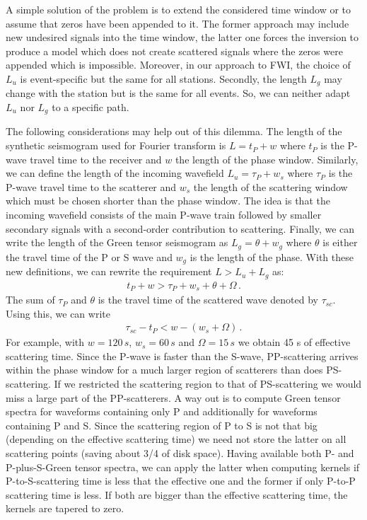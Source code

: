 A simple solution of the problem is to extend the considered time window or to assume that zeros have been appended to it. The former approach may include new undesired signals into the time window, the latter one forces the inversion to produce a model which does not create scattered signals where the zeros were appended which is impossible. Moreover, in our approach to FWI, the choice of $L_u$ is event-specific but the same for all stations. Secondly, the length $L_g$ may change with the station but is the same for all events. So, we can neither adapt $L_u$ nor $L_g$ to a specific path.

The following considerations may help out of this dilemma. The length of the synthetic seismogram used for Fourier transform is $L=t_P+w$ where $t_P$ is the P-wave travel time to the receiver and $w$ the length of the phase window. Similarly, we can define the length of the incoming wavefield $L_u = \tau_P+w_s$ where $\tau_P$ is the P-wave travel time to the scatterer and $w_s$ the length of the scattering window which must be chosen shorter than the phase window. The idea is that the incoming wavefield consists of the main P-wave train followed by smaller secondary signals with a second-order contribution to scattering. Finally, we can write the length of the Green tensor seismogram as $L_g = \theta+w_g$ where $\theta$ is either the travel time of the P or S wave and $w_g$ is the length of the phase. With these new definitions, we can rewrite the requirement $L > L_u+L_g$ as:
%
\begin{align}
	t_P+w > \tau_P + w_s+\theta+\Omega \,.
\end{align}
% 
The sum of $\tau_P$ and $\theta$ is the travel time of the scattered wave denoted by $\tau_{sc}$. Using this, we can write
%
\begin{align}
	\tau_{sc}-t_P < w-(w_s+\Omega) \,. 
\end{align}
% 
For example, with $w=120\,s$, $w_s = 60\,s$ and $\Omega = 15\,s$ we obtain 45 s of effective scattering time. Since the P-wave is faster than the S-wave, PP-scattering arrives within the phase window for a much larger region of scatterers than does PS-scattering. If we restricted the scattering region to that of PS-scattering we would miss a large part of the PP-scatterers. A way out is to compute Green tensor spectra for waveforms containing only P and additionally for waveforms containing P and S. Since the scattering region of P to S is not that big (depending on the effective scattering time) we need not store the latter on all scattering points (saving about 3/4 of disk space). Having available both P- and P-plus-S-Green tensor spectra, we can apply the latter when computing kernels if P-to-S-scattering time is less that the effective one and the former if only P-to-P scattering time is less. If both are bigger than the effective scattering time, the kernels are tapered to zero.

